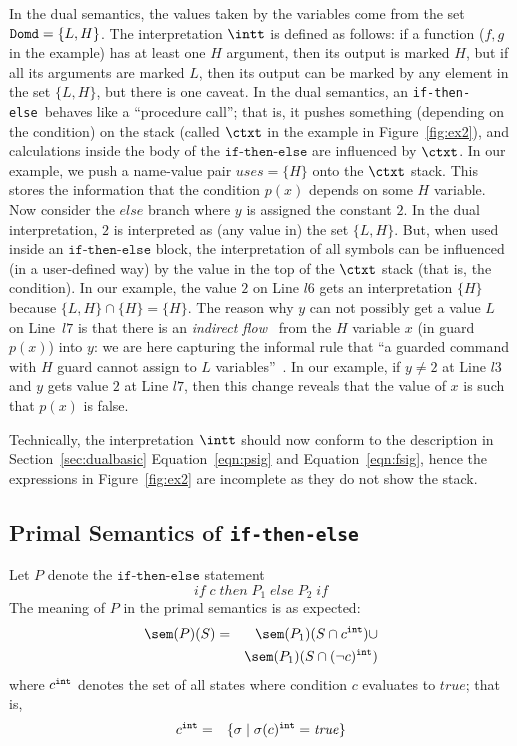 \documentclass[preprint]{sig-alternate-05-2015}
\def\int{{\tt{int}}}
\def\domd{{\tt{Domd}}}
\def\true{{\mathit{true}}}
\def\ite{{\texttt{if-then-else}}}
\def\iteif{{\mathit{if}}}
\def\itethen{{\mathit{then}}}
\def\iteelse{{\mathit{else}}}
\def\itefi{{\mathit{if}}}
\begin{document}
{In the dual semantics, the values taken by the variables come
from the set $\domd = \{L,H\}$.
The interpretation $\intt$ is defined as follows:
if a function ($f,g$ in the example)
has at least one $H$ argument, then its output is marked $H$, but
if all its arguments are marked $L$, then its output can be marked
by any element in the set $\{L,H\}$, but there is one caveat.
In the dual semantics, an \ite\ behaves like
a ``procedure call''; that is, it pushes something (depending on
the condition) on the stack (called $\ctxt$ in the example
in Figure~\ref{fig:ex2}), and calculations inside the body of the
$\ite$ are influenced by $\ctxt$.
In our example, we push a name-value pair $uses = \{H\}$ onto
the $\ctxt$ stack. This stores the information that the condition
$p(x)$ depends on some $H$ variable.
Now consider the $\iteelse$ branch where $y$ is assigned the constant
$2$.
In the dual interpretation, $2$ is interpreted as (any value in)
the set $\{L,H\}$. But, when used inside an $\ite$
block, the interpretation of all symbols can be influenced
(in a user-defined way) by
the value in the top of the $\ctxt$ stack (that is, the condition).
In our example, the value $2$ on Line $l6$ gets an interpretation
$\{H\}$ because $\{L,H\}\cap\{H\}=\{H\}$.
The reason why $y$ can not possibly get a value $L$ on Line~$l7$ is
that there is an {\em{indirect flow}}~\cite{DBLP:journals/cacm/DenningD77} from
the $H$ variable $x$ (in guard $p(x)$) into $y$: we are
here capturing the informal rule that ``a guarded
command with $H$ guard cannot assign to $L$
variables''~\cite{DBLP:conf/csfw/Smith01}.
In our example, if $y\neq 2$ at Line $l3$ and $y$ gets value $2$ at Line
$l7$, then this change reveals that the value of $x$ is such that $p(x)$ is
false.

Technically, the interpretation $\intt$ should now conform to the
description in Section~\ref{sec:dualbasic} Equation~\ref{eqn:psig} and
Equation~\ref{eqn:fsig}, hence the expressions in Figure~\ref{fig:ex2}
are incomplete as they do not show the stack.

\subsection{Primal Semantics of \ite}

Let $P$ denote the $\ite$
statement
$$
\iteif\; c\; \itethen\; P_1\;\iteelse\;P_2\;\itefi
$$
The meaning of $P$ in the primal semantics is as expected:
\begin{eqnarray*}
  \sem(P)(S) & = &
    \sem(P_1)(S\cap c^\int) \cup
    \\ & &
    \sem(P_1)(S\cap (\neg c)^\int)
\end{eqnarray*}
where $c^\int$ denotes the set of all states where
condition $c$ evaluates to $\true$; that is,
\begin{eqnarray*}
     c^\int & = &
  \{ \sigma \mid \sigma(c)^\int=\true \}
\end{eqnarray*}

}
\end{document}

